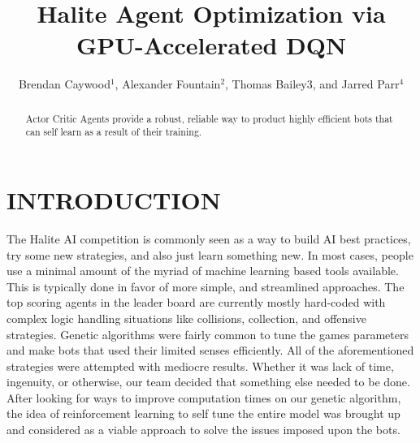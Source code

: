 \documentclass[letterpaper, 11 pt, conference]{ieeeconf}  %
\title{\LARGE \bf
Halite Agent Optimization via GPU-Accelerated DQN
}
\author{Brendan Caywood$^{1}$, Alexander Fountain$^{2}$, Thomas Bailey${3}$, and Jarred Parr$^{4}$%
}
\begin{document}
\maketitle
\thispagestyle{empty}
\pagestyle{empty}


\begin{abstract}

Actor Critic Agents provide a robust, reliable way to product highly efficient bots that can self learn as a result of their training.

\end{abstract}


\section{INTRODUCTION}

The Halite AI competition is commonly seen as a way to build AI best practices, try some new strategies, and also just learn something new. In most cases, people use a minimal amount of the myriad of machine learning based tools available. This is typically done in favor of more simple, and streamlined approaches. The top scoring agents in the leader board are currently mostly hard-coded with complex logic handling situations like collisions, collection, and offensive strategies. Genetic algorithms were fairly common to tune the games parameters and make bots that used their limited senses efficiently. All of the aforementioned strategies were attempted with mediocre results. Whether it was lack of time, ingenuity, or otherwise, our team decided that something else needed to be done. After looking for ways to improve computation times on our genetic algorithm, the idea of reinforcement learning to self tune the entire model was brought up and considered as a viable approach to solve the issues imposed upon the bots.
\end{document}
